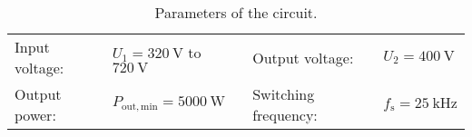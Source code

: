 \begin{table}[ht]
    \centering  %
    \begin{tabular}{llll}
        \toprule
        
        Input voltage: &  $U_{\mathrm{1}} = \SI{320}{\volt}$ to $\SI{720}{\volt}$ & Output voltage: & $U_{\mathrm{2}} = \SI{400}{\volt}$ \\ 
        Output power: & $P_{\mathrm{out,min}} = \SI{5000}{\watt}$ & Switching frequency: & $f_{\mathrm{s}} = \SI{25}{\kilo\hertz}$ \\ 
        \bottomrule
    \end{tabular}
    \caption{Parameters of the circuit.}  %
    \label{table:Parameters of the buck-boost converter.}
\end{table}
